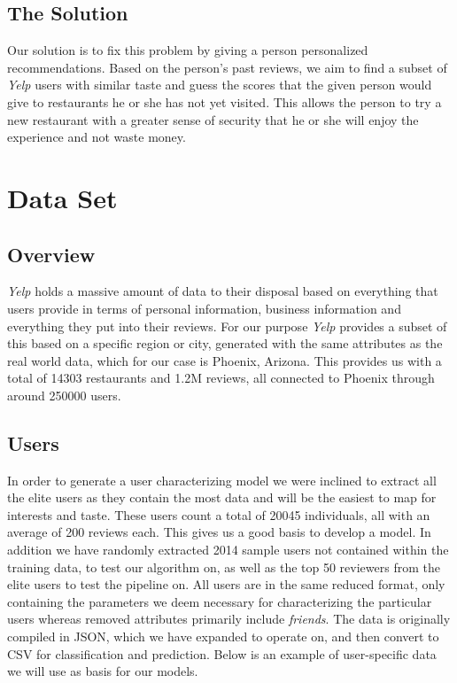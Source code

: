 \documentclass[10pt,twocolumn,letterpaper]{article}
\begin{document}
\subsection{The Solution}
Our solution is to fix this problem by giving a person personalized recommendations. Based on the person's past reviews, we aim to find a subset of \textit{Yelp} users with similar taste and guess the scores that the given person would give to restaurants he or she has not yet visited. This allows the person to try a new restaurant with a greater sense of security that he or she will enjoy the experience and not waste money. \cite{Alpher02}

\section{Data Set}
\subsection{Overview}
\textit{Yelp} holds a massive amount of data to their disposal based on everything that users provide in terms of personal information, business information and everything they put into their reviews. For our purpose \textit{Yelp} provides a subset of this based on a specific region or city, generated with the same attributes as the real world data, which for our case is Phoenix, Arizona. This provides us with a total of 14303 restaurants and 1.2M reviews, all connected to Phoenix through around 250000 users.

\subsection{Users}
In order to generate a user characterizing model we were inclined to extract all the elite users as they contain the most data and will be the easiest to map for interests and taste. These users count a total of 20045 individuals, all with an average of 200 reviews each. This gives us a good basis to develop a model. In addition we have randomly extracted 2014 sample users not contained within the training data, to test our algorithm on, as well as the top 50 reviewers from the elite users to test the pipeline on. All users are in the same reduced format, only containing the parameters we deem necessary for characterizing the particular users whereas removed attributes primarily include \textit{friends}. The data is originally compiled in JSON, which we have expanded to operate on, and then convert to CSV for classification and prediction. Below is an example of user-specific data we will use as basis for our models.
\end{document}
